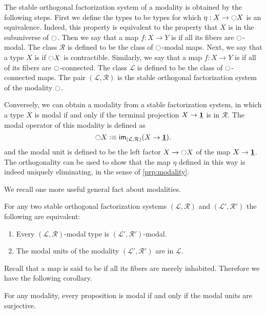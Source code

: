 \documentclass[9pt,twosided]{amsart}
\begin{document}
The stable orthogonal factorization system of a modality is obtained by the following steps. First we define the  types to be types for which $\eta:X\to{\ensuremath{\ocircle}} X$ is an equivalence. Indeed, this property is equivalent to the property that $X$ is in the subuniverse of ${\ocircle}$. Then we say that a map $f:X\to Y$ is  if all its fibers are ${\ocircle}$-modal. The class $\mathcal{R}$ is defined to be the class of ${\ocircle}$-modal maps. Next, we say that a type $X$ is  if ${\ocircle} X$ is contractible. Similarly, we say that a map $f:X\to Y$ is  if all of its fibers are ${\ocircle}$-connected. The class $\mathcal{L}$ is defined to be the class of ${\ocircle}$-connected maps. The pair $(\mathcal{L},\mathcal{R})$ is the stable orthogonal factorization system of the modality ${\ocircle}$.

Conversely, we can obtain a modality from a stable factorization system, in which a type $X$ is modal if and only if the terminal projection $X\to \underline{\mathbf{1}}$ is in $\mathcal{R}$. The modal operator of this modality is defined as
\begin{equation*}
{\ensuremath{\ocircle}} X \vcentcolon\equiv \mathsf{im}_{(\mathcal{L},\mathcal{R})}(X\to \underline{\mathbf{1}}).
\end{equation*}
and the modal unit is defined to be the left factor $X \to {\ensuremath{\ocircle}} X$ of the map $X\to \underline{\mathbf{1}}$. The orthogonality can be used to show that the map $\eta$ defined in this way is indeed uniquely eliminating, in the sense of \cref{prp:modality}.

We recall one more useful general fact about modalities.

\begin{thm}
  For any two stable orthogonal factorization systems $(\mathcal{L},\mathcal{R})$ and $(\mathcal{L}',\mathcal{R}')$ the following are equivalent:
\begin{enumerate}
\item Every $(\mathcal{L},\mathcal{R})$-modal type is $(\mathcal{L}',\mathcal{R}')$-modal.
\item The modal units of the modality $(\mathcal{L}',\mathcal{R}')$ are in $\mathcal{L}$.
\end{enumerate}
\end{thm}

Recall that a map is said to be  if all its fibers are merely inhabited. Therefore we have the following corollary.

\begin{cor}\label{cor:units-surjective}
  For any modality, every proposition is modal if and only if the modal units are surjective.
\end{cor}
\end{document}
